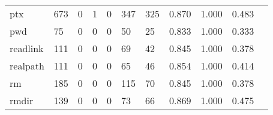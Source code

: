 \begin{longtable}{lp{1.2cm}p{1.2cm}p{1.2cm}p{1.2cm}p{1.2cm}p{1.2cm}p{1.2cm}p{1.2cm}p{1.2cm}p{1.2cm}}
ptx       &                                   673 &                                                  0 &                                                  1 &                                                  0 &                                                347 &                                                325 &                                         0.870 &                                              1.000 &                                              0.483 \\
pwd       &                                    75 &                                                  0 &                                                  0 &                                                  0 &                                                 50 &                                                 25 &                                         0.833 &                                              1.000 &                                              0.333 \\
readlink  &                                   111 &                                                  0 &                                                  0 &                                                  0 &                                                 69 &                                                 42 &                                         0.845 &                                              1.000 &                                              0.378 \\
realpath  &                                   111 &                                                  0 &                                                  0 &                                                  0 &                                                 65 &                                                 46 &                                         0.854 &                                              1.000 &                                              0.414 \\
rm        &                                   185 &                                                  0 &                                                  0 &                                                  0 &                                                115 &                                                 70 &                                         0.845 &                                              1.000 &                                              0.378 \\
rmdir     &                                   139 &                                                  0 &                                                  0 &                                                  0 &                                                 73 &                                                 66 &                                         0.869 &                                              1.000 &                                              0.475 \\

\end{longtable}
